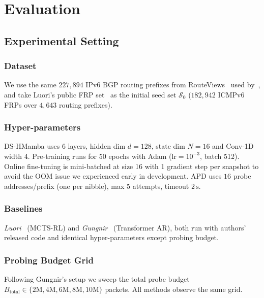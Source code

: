 \documentclass[conference]{IEEEtran}
\begin{document}
\section{Evaluation}\label{sec:eval}

\subsection{Experimental Setting}\label{sec:eval:setup}

\subsubsection{Dataset}  We use the same $227{,}894$ IPv6 BGP
routing prefixes from
RouteViews~\cite{routeviews} used
by~\cite{wei2025gungnir}, and take Luori's public
FRP set~\cite{cheng2024luori} as the initial seed set
$\mathcal{S}_0$ ($182{,}942$ ICMPv6 FRPs over $4{,}643$
routing prefixes).

\subsubsection{Hyper-parameters}
DS-HMamba uses 6 layers, hidden dim $d=128$, state dim $N=16$
and Conv-1D width 4.  Pre-training runs for 50 epochs with
Adam ($\text{lr}=10^{-3}$, batch 512).  Online fine-tuning is
mini-batched at size 16 with 1 gradient step per snapshot to
avoid the OOM issue we experienced early in development.
APD uses $16$ probe addresses/prefix (one per nibble), max
$5$ attempts, timeout $2\,\text{s}$.

\subsubsection{Baselines}
\emph{Luori}~\cite{cheng2024luori} (MCTS-RL) and
\emph{Gungnir}~\cite{wei2025gungnir} (Transformer AR), both run
with authors' released code and identical hyper-parameters
except probing budget.

\subsubsection{Probing Budget Grid}
Following Gungnir's setup we sweep the total probe budget
$B_{\text{total}}\!\in\!\{2\text{M},4\text{M},6\text{M},
8\text{M},10\text{M}\}$ packets.  All methods observe the
same grid.
\end{document}
